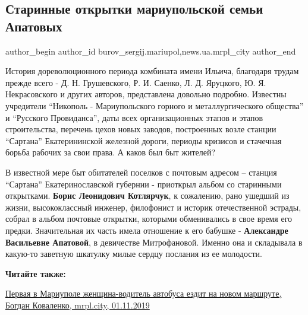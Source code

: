  
 
 
 
 
 
\subsection{Старинные открытки мариупольской семьи Апатовых}
\label{sec:02_11_2019.stz.news.ua.mrpl_city.1.otkrytki_semja_apatovyh}
 
\ifcmt
 author_begin
   author_id burov_sergij.mariupol,news.ua.mrpl_city
 author_end
\fi


История дореволюционного периода комбината имени Ильича, благодаря трудам
прежде всего - Д. Н. Грушевского, Р. И. Саенко, Л. Д. Яруцкого, Ю. Я. Некрасовского
и других авторов, представлена довольно подробно. Известны учредители \enquote{Никополь
- Мариупольского горного и металлургического общества} и \enquote{Русского Провиданса},
даты всех организационных этапов и этапов строительства, перечень цехов новых
заводов, построенных возле станции \enquote{Сартана} Екатерининской железной дороги,
периоды кризисов и стачечная борьба рабочих за свои права. А каков был быт
жителей?

В известной мере быт обитателей поселков с почтовым адресом – станция \enquote{Сартана}
Екатеринославской губернии - приоткрыл альбом со старинными открытками. \textbf{Борис
Леонидович Котлярчук}, к сожалению, рано ушедший из жизни, высококлассный
инженер, филофонист и историк отечественной эстрады, собрал в альбом почтовые
открытки, которыми обменивались в свое время его предки. Значительная их часть
имела отношение к его бабушке - \textbf{Александре Васильевне Апатовой}, в девичестве
Митрофановой. Именно она и складывала в какую-то заветную шкатулку милые сердцу
послания из ее молодости.

\textbf{Читайте также:} 

\href{https://mrpl.city/news/view/pervaya-v-mariupole-zhenshhina-voditel-avtobusa-ezdit-na-novom-marshrute-foto-plusvideo-pluspanorama-360}{%
Первая в Мариуполе женщина-водитель автобуса ездит на новом маршруте, Богдан Коваленко, mrpl.city, 01.11.2019}

